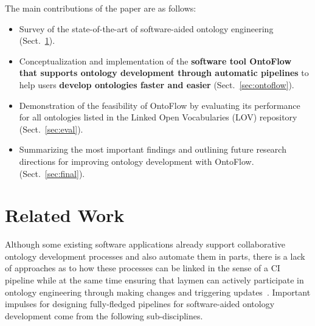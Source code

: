 \documentclass[runningheads]{llncs}
\begin{document}
The main contributions of the paper are as follows: 
\begin{itemize}
\item Survey of the state-of-the-art of software-aided ontology engineering (Sect.~\ref{sec:related}). 
\item Conceptualization and implementation of the \textbf{software tool OntoFlow that supports ontology development through automatic pipelines} to help users \textbf{develop ontologies faster and easier} (Sect.~\ref{sec:ontoflow}).  
\item Demonstration of the feasibility of OntoFlow by evaluating its performance for all ontologies listed in the Linked Open Vocabularies (LOV) repository (Sect.~\ref{sec:eval}).
\item Summarizing the most important findings and outlining future research directions for improving ontology development with OntoFlow. (Sect.~\ref{sec:final}).
\end{itemize}

\section{Related Work}\label{sec:related}
Although some existing software applications already support collaborative ontology development processes and also automate them in parts, there is a lack of approaches as to how these processes can be linked in the sense of a CI pipeline while at the same time ensuring that laymen can actively participate in ontology engineering through making changes and triggering updates~\cite{mungall}. Important impulses for designing fully-fledged pipelines for software-aided ontology development come from the following sub-disciplines.
\end{document}
